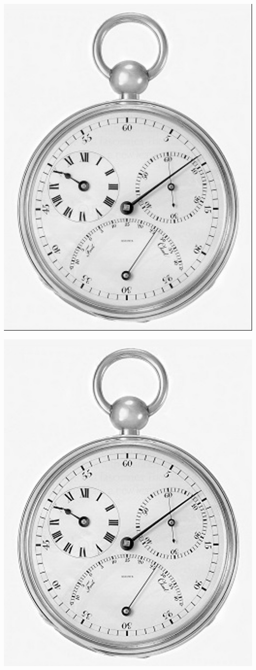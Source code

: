 \documentclass[notheorems,serif,table,compress]{beamer}  %
\begin{document}
\begin{frame}
\begin{minipage}[t]{0.32\linewidth}
        \includegraphics[width=0.9\linewidth]{Bilinear-pots.jpg} 
        \end{minipage}
	\begin{minipage}[t]{0.32\linewidth}
        \centering
        \includegraphics[width=0.9\linewidth]{Bicubic.jpg} 
        \end{minipage}
\end{frame}
\end{document}
